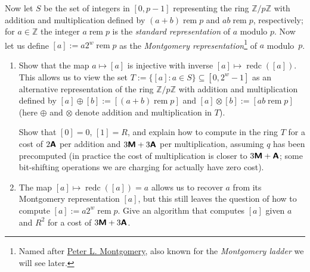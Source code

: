 \documentclass[11pt]{article}
\newcommand{\Z}{\mathbb{Z}}
\newcommand{\rem}{\operatorname{rem}}
\newcommand{\redc}{\operatorname{redc}}
\newcommand{\M}{\textbf{\textsf M}}
\newcommand{\A}{\textbf{\textsf A}}
\begin{document}
Now let $S$ be the set of integers in $[0,p-1]$ representing the ring $\Z/p\Z$ with addition and multiplication defined by $(a+b)\rem p$ and $ab\rem p$, respectively; for $a\in\Z$ the integer $a\rem p$ is the \emph{standard representation} of $a$ modulo $p$.
Now let us define $[a] := a2^w\rem p$ as the \textit{Montgomery representation}\footnote{Named after \href{https://en.wikipedia.org/wiki/Peter_Montgomery_(mathematician)}{Peter L. Montgomery}, also known for the \textit{Montgomery ladder} we will see later.} of $a$ modulo~$p$.
\begin{enumerate}
\item[\textbf{(c)}]
Show that the map $a\mapsto [a]$ is injective with inverse $[a]\mapsto \redc([a])$.  This allows us to view the set $T:=\{[a]: a\in S\}\subseteq[0,2^w-1]$ as an alternative representation of the ring $\Z/p\Z$ with addition and multiplication defined by $[a]\oplus [b]:=[(a+b)\rem p]$ and $[a]\otimes[b]:=[ab\rem p]$ (here $\oplus$ and $\otimes$ denote addition and multiplication in $T$).

Show that $[0]=0$, $[1]=R$, and explain how to compute in the ring $T$ for a cost of $2\A$ per addition and $3\M+3\A$ per multiplication, assuming $q$ has been precomputed (in practice the cost of multiplication is closer to $3\M+\A$; some bit-shifting operations we are charging for actually have zero cost).
\item[\textbf{(d)}] The map $[a]\mapsto \redc([a])=a$ allows us to recover $a$ from its Montgomery representation $[a]$, but this still leaves the question of how to compute $[a]:=a2^w\rem p$.  Give an algorithm that computes $[a]$ given $a$ and $R^2$ for a cost of $3\M+3\A$.
\end{enumerate}
\end{document}
